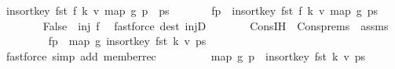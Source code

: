 \begin{isabellebody}
\ {\isachardoublequoteopen}insort{\isacharunderscore}{\kern0pt}key\ fst\ {\isacharparenleft}{\kern0pt}f\ k{\isacharcomma}{\kern0pt}\ v{\isacharparenright}{\kern0pt}\ {\isacharparenleft}{\kern0pt}map\ {\isacharquery}{\kern0pt}g\ {\isacharparenleft}{\kern0pt}p\ {\isacharhash}{\kern0pt}\ ps{\isacharparenright}{\kern0pt}{\isacharparenright}{\kern0pt}\ {\isacharequal}{\kern0pt}\isanewline
\ \ \ \ \ \ {\isacharquery}{\kern0pt}f{\isacharunderscore}{\kern0pt}p\ {\isacharhash}{\kern0pt}\ insort{\isacharunderscore}{\kern0pt}key\ fst\ {\isacharparenleft}{\kern0pt}f\ k{\isacharcomma}{\kern0pt}\ v{\isacharparenright}{\kern0pt}\ {\isacharparenleft}{\kern0pt}map\ {\isacharquery}{\kern0pt}g\ ps{\isacharparenright}{\kern0pt}{\isachardoublequoteclose}\isanewline
\ \ \ \ \ \ \isamarkupfalse%
\ False\ \ {\isacartoucheopen}inj\ f{\isacartoucheclose}\ \isamarkupfalse%
\ {\isacharparenleft}{\kern0pt}fastforce\ dest{\isacharcolon}{\kern0pt}\ injD{\isacharparenright}{\kern0pt}\isanewline
\ \ \ \ \isamarkupfalse%
\ \isamarkupfalse%
\ Cons{\isachardot}{\kern0pt}IH\ \ Cons{\isachardot}{\kern0pt}prems{\isacharparenleft}{\kern0pt}{}{\isacharcomma}{\kern0pt}{}{\isacharparenright}{\kern0pt}\ \ assms{\isacharparenleft}{\kern0pt}{}{\isacharcomma}{\kern0pt}{}{\isacharparenright}{\kern0pt}\ \isamarkupfalse%
\ {\isachardoublequoteopen}{\isasymdots}\ {\isacharequal}{\kern0pt}\isanewline
\ \ \ \ \ \ {\isacharquery}{\kern0pt}f{\isacharunderscore}{\kern0pt}p\ {\isacharhash}{\kern0pt}\ {\isacharparenleft}{\kern0pt}map\ {\isacharquery}{\kern0pt}g\ {\isacharparenleft}{\kern0pt}insort{\isacharunderscore}{\kern0pt}key\ fst\ {\isacharparenleft}{\kern0pt}k{\isacharcomma}{\kern0pt}\ v{\isacharparenright}{\kern0pt}\ ps{\isacharparenright}{\kern0pt}{\isacharparenright}{\kern0pt}{\isachardoublequoteclose}\isanewline
\ \ \ \ \ \ \isamarkupfalse%
\ {\isacharparenleft}{\kern0pt}fastforce\ simp\ add{\isacharcolon}{\kern0pt}\ member{\isacharunderscore}{\kern0pt}rec{\isacharparenleft}{\kern0pt}{}{\isacharparenright}{\kern0pt}{\isacharparenright}{\kern0pt}\isanewline
\ \ \ \ \isamarkupfalse%
\ \isamarkupfalse%
\ {\isachardoublequoteopen}{\isasymdots}\ {\isacharequal}{\kern0pt}\ map\ {\isacharquery}{\kern0pt}g\ {\isacharparenleft}{\kern0pt}p\ {\isacharhash}{\kern0pt}\ insort{\isacharunderscore}{\kern0pt}key\ fst\ {\isacharparenleft}{\kern0pt}k{\isacharcomma}{\kern0pt}\ v{\isacharparenright}{\kern0pt}\ ps{\isacharparenright}{\kern0pt}{\isachardoublequoteclose}\isanewline

\end{isabellebody}
